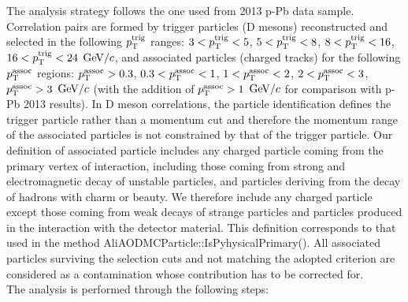 The analysis strategy follows the one used from 2013 p-Pb data sample. Correlation pairs are formed by
trigger particles (D mesons) reconstructed and selected in the following $p_{\rm T}^{\rm trig}$ ranges: $3<p_{\rm T}^{\rm trig}<5$, $5<p_{\rm T}^{\rm trig}<8$, $8<p_{\rm T}^{\rm trig}<16$, $16<p_{\rm T}^{\rm trig}<24$ $\mathrm{GeV}/c$, and associated particles (charged tracks) for the following $p_{\rm T}^{\rm assoc}$ regions: $p_{\rm T}^{\rm assoc}>0.3$, $0.3<p_{\rm T}^{\rm assoc}<1$, $1<p_{\rm T}^{\rm assoc}<2$, $2<p_{\rm T}^{\rm assoc}<3$, $p_{\rm T}^{\rm assoc}>3$ $\mathrm{GeV}/c$ (with the addition of $p_{\rm T}^{\rm assoc}>1$ $\mathrm{GeV}/c$ for comparison with p-Pb 2013 results). In D meson correlations, the particle identification
defines the trigger particle rather than a momentum cut and therefore the momentum range of the associated particles is not constrained by that of the trigger particle. Our definition of associated particle includes any charged particle coming from the primary vertex of interaction, including
those coming from strong and electromagnetic decay of unstable particles, and particles deriving from the
decay of hadrons with charm or beauty.
We therefore include any charged particle except those coming from weak decays of strange particles and particles produced in the interaction with the detector material. This definition corresponds to that used in the method AliAODMCParticle::IsPyhysicalPrimary().
All associated particles surviving the selection cuts and not matching the adopted criterion are considered as a contamination whose contribution has to be corrected for. \\

The analysis is performed through the following steps:

